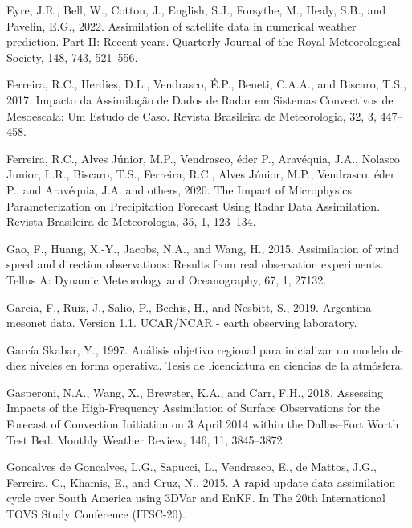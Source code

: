 \documentclass[12pt,twoside]{reedthesis}
\begin{document}
\leavevmode\hypertarget{ref-eyre2022}{}%
Eyre, J.R., Bell, W., Cotton, J., English, S.J., Forsythe, M., Healy, S.B., and Pavelin, E.G., 2022. Assimilation of satellite data in numerical weather prediction. Part II: Recent years. Quarterly Journal of the Royal Meteorological Society, 148, 743, 521--556.

\leavevmode\hypertarget{ref-ferreira2017}{}%
Ferreira, R.C., Herdies, D.L., Vendrasco, É.P., Beneti, C.A.A., and Biscaro, T.S., 2017. Impacto da Assimilação de Dados de Radar em Sistemas Convectivos de Mesoescala: Um Estudo de Caso. Revista Brasileira de Meteorologia, 32, 3, 447--458.

\leavevmode\hypertarget{ref-ferreira2020}{}%
Ferreira, R.C., Alves Júnior, M.P., Vendrasco, éder P., Aravéquia, J.A., Nolasco Junior, L.R., Biscaro, T.S., Ferreira, R.C., Alves Júnior, M.P., Vendrasco, éder P., and Aravéquia, J.A. and others, 2020. The Impact of Microphysics Parameterization on Precipitation Forecast Using Radar Data Assimilation. Revista Brasileira de Meteorologia, 35, 1, 123--134.

\leavevmode\hypertarget{ref-gao2015}{}%
Gao, F., Huang, X.-Y., Jacobs, N.A., and Wang, H., 2015. Assimilation of wind speed and direction observations: Results from real observation experiments. Tellus A: Dynamic Meteorology and Oceanography, 67, 1, 27132.

\leavevmode\hypertarget{ref-garcia2019}{}%
Garcia, F., Ruiz, J., Salio, P., Bechis, H., and Nesbitt, S., 2019. Argentina mesonet data. Version 1.1. UCAR/NCAR - earth observing laboratory.

\leavevmode\hypertarget{ref-garciaskabar1997}{}%
García Skabar, Y., 1997. Análisis objetivo regional para inicializar un modelo de diez niveles en forma operativa. Tesis de licenciatura en ciencias de la atmósfera.

\leavevmode\hypertarget{ref-gasperoni2018}{}%
Gasperoni, N.A., Wang, X., Brewster, K.A., and Carr, F.H., 2018. Assessing Impacts of the High-Frequency Assimilation of Surface Observations for the Forecast of Convection Initiation on 3 April 2014 within the Dallas--Fort Worth Test Bed. Monthly Weather Review, 146, 11, 3845--3872.

\leavevmode\hypertarget{ref-goncalvesdegoncalves2015}{}%
Goncalves de Goncalves, L.G., Sapucci, L., Vendrasco, E., de Mattos, J.G., Ferreira, C., Khamis, E., and Cruz, N., 2015. A rapid update data assimilation cycle over South America using 3DVar and EnKF. In The 20th International TOVS Study Conference (ITSC-20).
\end{document}
